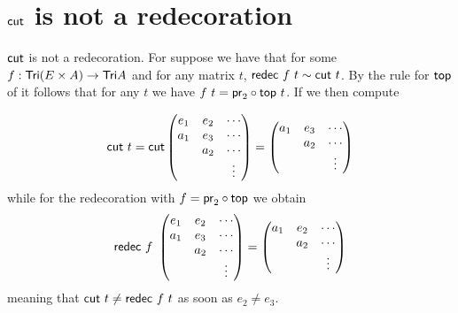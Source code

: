 


\section{$\mathsf{cut}$ is not a redecoration}

\begin{remark}
 $\mathsf{cut}$ is not a redecoration. For suppose we have that for some $f : \mathsf{Tri}(E\times A) \to \mathsf{Tri} A$ and for any matrix $t$, $\mathsf{redec}~f~t \sim \mathsf{cut}~t$.
 By the rule for $\mathsf{top}$ of  it follows that for any $t$ we have 
 $f~t = {\mathsf{pr}_2} \circ {\ensuremath{\mathsf{top}}}~t$.
 If we then compute 
 
  \[ \mathsf{cut}~t = \mathsf{cut} 
              \begin{pmatrix}
                     e_{1} & e_{2} & \cdots   \\
                     a_{1} & e_{3} & \cdots   \\
                           & a_{2} & \cdots   \\
                           &       & \vdots  
              \end{pmatrix} =              
              \begin{pmatrix}
                     a_{1} & e_{3} & \cdots   \\
                           & a_{2} & \cdots   \\
                           &       & \vdots  
              \end{pmatrix}              
  \]
 while for the redecoration with $f = {\mathsf{pr}_2} \circ {\ensuremath{\mathsf{top}}}$ we obtain
  \[ \mathsf{redec}~f~ 
              \begin{pmatrix}
                     e_{1} & e_{2} & \cdots   \\
                     a_{1} & e_{3} & \cdots   \\
                           & a_{2} & \cdots   \\
                           &       & \vdots  
              \end{pmatrix} =              
              \begin{pmatrix}
                     a_{1} & e_{2} & \cdots   \\
                           & a_{2} & \cdots   \\
                           &       & \vdots  
              \end{pmatrix}              
  \]
  meaning that $\mathsf{cut}~t \neq \mathsf{redec}~f~t$ as soon as $e_2 \neq e_3$.
\end{remark}



% 
% 
